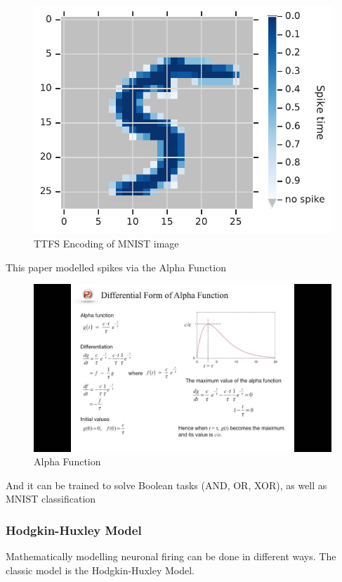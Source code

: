 \documentclass[main]{subfiles}
\begin{document}
\begin{figure}[H]
	\centering
	\includegraphics[width=0.9\linewidth]{09_WhySpikes/figures/figure2.pdf}
	\caption{TTFS Encoding of MNIST image}
\end{figure}

This paper modelled spikes via the Alpha Function

\begin{figure}[H]
	\centering
	\includegraphics[width=0.9\linewidth]{09_WhySpikes/figures/whatsanalphafunction.jpg}
	\caption{Alpha Function}
\end{figure}

And it can be trained to solve Boolean tasks (AND, OR, XOR), as well as MNIST classification

\subsubsection{Hodgkin-Huxley Model}

Mathematically modelling neuronal firing can be done in different ways. The classic model is the Hodgkin-Huxley Model.
\end{document}
